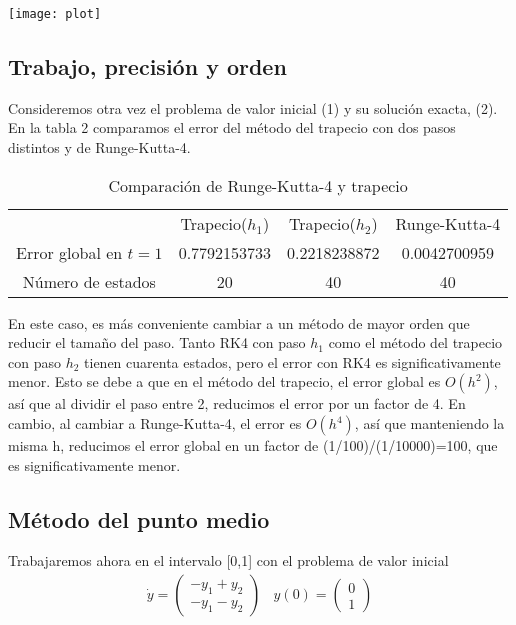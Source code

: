 \documentclass[spanish]{article}
\begin{document}
\texttt{[image: plot]}

\newpage
\noindent
\subsection{Trabajo, precisión y orden}
Consideremos otra vez el problema de valor inicial (1) y su solución exacta, (2). En la tabla 2 comparamos
el error del método del trapecio con dos pasos distintos y de Runge-Kutta-4. 

\begin{table}[h]
\caption{Comparación de Runge-Kutta-4 y trapecio}
\centering
\begin{tabular}{cccc}
\hline \hline
$ $ & Trapecio($h_1$) & Trapecio($h_2$) & Runge-Kutta-4 \\
Error global en $t=1$ & 0.7792153733  &  0.2218238872 & 0.0042700959 \\
Número de estados  &     20       &       40       &       40 \\
\hline
\end{tabular}
\end{table}
En este caso, es más conveniente cambiar a un método de mayor orden que reducir el
tamaño del paso. Tanto RK4 con paso $h_1$ como el método del trapecio con paso 
$h_2$ tienen cuarenta estados, pero el error con RK4 es significativamente menor.
Esto se debe a que en el método del trapecio, el error global es $O(h^2)$, así que al 
dividir el paso entre 2, reducimos el error por un factor de 4. En cambio, al 
cambiar a Runge-Kutta-4, el error es $O(h^4)$, así que manteniendo  la misma h, reducimos el error global en un factor de (1/100)/(1/10000)=100, que es significativamente menor. 

\noindent
\subsection{Método del punto medio}
Trabajaremos ahora en el intervalo [0,1] con el problema de valor inicial 
\begin{align*}
\dot{y} = \begin{pmatrix}
-y_1+y_2 \\
-y_1-y_2
\end{pmatrix}
\ \ \ \ y(0) = \begin{pmatrix}
0  \\ 1
\end{pmatrix}
\end{align*}
\end{document}
